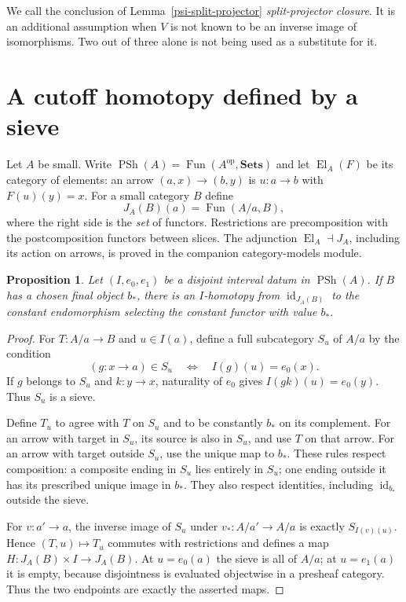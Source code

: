 \documentclass[11pt]{amsart}
\newtheorem{proposition}{Proposition}[section]
\theoremstyle{remark}
\newcommand{\PSh}{\operatorname{PSh}}
\newcommand{\El}{\operatorname{El}}
\newcommand{\Fun}{\operatorname{Fun}}
\newcommand{\id}{\operatorname{id}}
\newcommand{\PSM}[1]{\par\smallskip{\small\raggedright\noindent Source-map identifiers: \texttt{#1}.\par}\smallskip}
\begin{document}
We call the conclusion of Lemma~\ref{psi-split-projector}
\emph{split-projector closure}. It is an additional assumption when
$V$ is not known to be an inverse image of isomorphisms. Two out of
three alone is not being used as a substitute for it.

\section{A cutoff homotopy defined by a sieve}

Let $A$ be small. Write $\PSh(A)=\Fun(A^{\mathrm{op}},\mathbf{Sets})$
and let $\El_A(F)$ be its category of elements: an arrow
$(a,x)\to(b,y)$ is $u:a\to b$ with $F(u)(y)=x$.
For a small category $B$ define
\[
 J_A(B)(a)=\Fun(A/a,B),
\]
where the right side is the \emph{set} of functors. Restrictions are
precomposition with the postcomposition functors between slices.
The adjunction $\El_A\dashv J_A$, including its action on arrows,
is proved in the companion category-models module.

\begin{proposition}\label{psi-cutoff}
Let $(I,e_0,e_1)$ be a disjoint interval datum in $\PSh(A)$.
If $B$ has a chosen final object $b_*$, there is an $I$-homotopy
from $\id_{J_A(B)}$ to the constant endomorphism selecting the
constant functor with value $b_*$.
\end{proposition}
\PSM{PSM-PROP-0014}
\begin{proof}
For $T:A/a\to B$ and $u\in I(a)$, define a full subcategory $S_u$
of $A/a$ by the condition
\[
 (g:x\to a)\in S_u \quad\Longleftrightarrow\quad I(g)(u)=e_0(x).
\]
If $g$ belongs to $S_u$ and $k:y\to x$, naturality of $e_0$ gives
$I(gk)(u)=e_0(y)$. Thus $S_u$ is a sieve.

Define $T_u$ to agree with $T$ on $S_u$ and to be constantly $b_*$
on its complement. For an arrow with target in $S_u$, its source is
also in $S_u$, and use $T$ on that arrow. For an arrow with target
outside $S_u$, use the unique map to $b_*$. These rules respect
composition: a composite ending in $S_u$ lies entirely in $S_u$;
one ending outside it has its prescribed unique image in $b_*$.
They also respect identities, including $\id_{b_*}$ outside the sieve.

For $v:a'\to a$, the inverse image of $S_u$ under $v_*:A/a'\to A/a$
is exactly $S_{I(v)(u)}$. Hence $(T,u)\mapsto T_u$ commutes with
restrictions and defines a map $H:J_A(B)\times I\to J_A(B)$.
At $u=e_0(a)$ the sieve is all of $A/a$; at $u=e_1(a)$ it is empty,
because disjointness is evaluated objectwise in a presheaf category.
Thus the two endpoints are exactly the asserted maps.
\end{proof}
\end{document}
